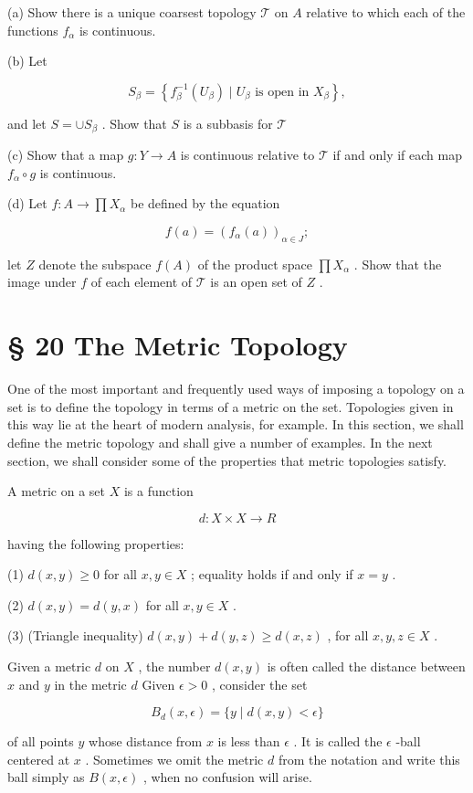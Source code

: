 (a) Show there is a unique coarsest topology \(\mathcal{T}\) on \(A\) relative to which each of the functions \({f}_{\alpha }\) is continuous.

(b) Let

\[
{S}_{\beta } = \left\{  {{f}_{\beta }^{-1}\left( {U}_{\beta }\right)  \mid  {U}_{\beta }\text{ is open in }{X}_{\beta }}\right\}  ,
\]

and let \(S =  \cup  {S}_{\beta }\) . Show that \(S\) is a subbasis for \(\mathcal{T}\)

(c) Show that a map \(g : Y \rightarrow  A\) is continuous relative to \(\mathcal{T}\) if and only if each map \({f}_{\alpha } \circ  g\) is continuous.

(d) Let \(f : A \rightarrow  \prod {X}_{\alpha }\) be defined by the equation

\[
f\left( a\right)  = {\left( {f}_{\alpha }\left( a\right) \right) }_{\alpha  \in  J};
\]

let \(Z\) denote the subspace \(f\left( A\right)\) of the product space \(\prod {X}_{\alpha }\) . Show that the image under \(f\) of each element of \(\mathcal{T}\) is an open set of \(Z\) .

\section*{§ 20 The Metric Topology}

One of the most important and frequently used ways of imposing a topology on a set is to define the topology in terms of a metric on the set. Topologies given in this way lie at the heart of modern analysis, for example. In this section, we shall define the metric topology and shall give a number of examples. In the next section, we shall consider some of the properties that metric topologies satisfy.

\begin{definition} A metric on a set \(X\) is a function

\[
d : X \times  X \rightarrow  R
\]

having the following properties:

(1) \(d\left( {x,y}\right)  \geq  0\) for all \(x,y \in  X\) ; equality holds if and only if \(x = y\) .

(2) \(d\left( {x,y}\right)  = d\left( {y,x}\right)\) for all \(x,y \in  X\) .

(3) (Triangle inequality) \(d\left( {x,y}\right)  + d\left( {y,z}\right)  \geq  d\left( {x,z}\right)\) , for all \(x,y,z \in  X\) .

Given a metric \(d\) on \(X\) , the number \(d\left( {x,y}\right)\) is often called the distance between \(x\) and \(y\) in the metric \(d\) Given \(\epsilon  > 0\) , consider the set

\[
{B}_{d}\left( {x,\epsilon }\right)  = \{ y \mid  d\left( {x,y}\right)  < \epsilon \}
\]

of all points \(y\) whose distance from \(x\) is less than \(\epsilon\) . It is called the \(\epsilon\) -ball centered at \(x\) . Sometimes we omit the metric \(d\) from the notation and write this ball simply as \(B\left( {x,\epsilon }\right)\) , when no confusion will arise.
\end{definition}

